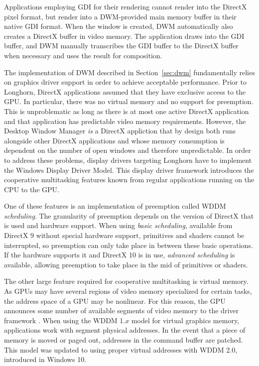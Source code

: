 			Applications employing GDI for their rendering cannot render into
			the DirectX pixel format, but render into a DWM-provided main memory
			buffer in their native GDI format. When the window is created, DWM
			automatically also creates a DirectX buffer in video memory. The
			application draws into the GDI buffer, and DWM manually transcribes
			the GDI buffer to the DirectX buffer when necessary and uses the result
			for composition.
			\cite{dwmredirect}

		\label{sec:wddm}
			The implementation of DWM described in Section~\ref{sec:dwm}
			fundamentally relies on graphics driver support in order to achieve
			acceptable performance.  Prior to Longhorn, DirectX applications
			assumed that they have exclusive access to the GPU. In particular,
			there was no virtual memory and no support for preemption. This is
			unproblematic as long as there is at most one active DirectX application
			and that application has predictable video memory requirements.
			However, the Desktop Window Manager \emph{is} a DirectX appliction that
			by design both runs alongside other DirectX applications and whose
			memory consumption is dependent on the number of open windows and therefore
			unpredictable.
			In order to address these problems, display drivers targeting Longhorn
			have to implement the Windows Display Driver Model. This
			display driver framework introduces the cooperative multitasking
			features known from regular applications running on the CPU to the
			GPU. \cite{dwmwddm}

			One of these features is an implementation of preemption called
			WDDM \emph{scheduling}. The granularity of preemption depends on
			the version of DirectX that is used and hardware support. When
			using \emph{basic scheduling}, available from DirectX 9 without
			special hardware support, primitives and shaders cannot be interrupted,
			so preemption can only take place in between these basic operations.
			If the hardware supports it and DirectX 10 is in use, \emph{advanced
			scheduling} is available, allowing preemption to take place in the mid
			of primitives or shaders. \cite{dwmwddm}

			The other large feature required for cooperative multitasking is
			virtual memory. As GPUs may have several regions of video memory
			specialized for certain tasks, the address space of a GPU may
			be nonlinear. For this reason, the GPU announces some number of
			available segments of video memory to the driver framework \cite{gpuseg}.
			When using the WDDM 1.$x$ model for virtual graphics
			memory, applications work with segment physical addresses. In the event
			that a piece of memory is moved or paged out, addresses in the command
			buffer are patched. This model was updated to using proper virtual
			addresses with WDDM 2.0, introduced in Windows 10. \cite{wddm2}

